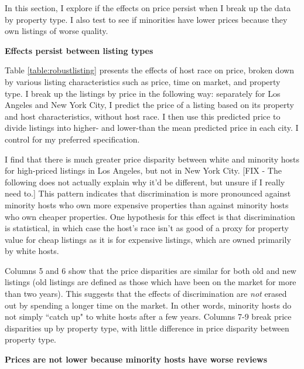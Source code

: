 
In this section, I explore if the effects on price persist when I break up the data by property type. I also test to see if minorities have lower prices because they own listings of worse quality. 

\textbf{Effects persist between listing types}

Table \ref{table:robustlisting} presents the effects of host race on price, broken down by various listing characteristics such as price, time on market, and property type. I break up the listings by price in the following way: separately for Los Angeles and New York City, I predict the price of a listing based on its property and host characteristics, without host race. I then use this predicted price to divide listings into higher- and lower-than the mean predicted price in each city. I control for my preferred specification.  

I find that there is much greater price disparity between white and minority hosts for high-priced listings in Los Angeles, but not in New York City. [FIX - The following does not actually explain why it'd be different, but unsure if I really need to.] This pattern indicates that discrimination is more pronounced against minority hosts who own more expensive properties than against minority hosts who own cheaper properties. One hypothesis for this effect is that discrimination is statistical, in which case the host's race isn't as good of a proxy for property value for cheap listings as it is for expensive listings, which are owned primarily by white hosts. 

Columns 5 and 6 show that the price disparities are similar for both old and new listings (old listings are defined as those which have been on the market for more than two years). This suggests that the effects of discrimination are \textit{not} erased out by spending a longer time on the market. In other words, minority hosts do not simply ``catch up" to white hosts after a few years. Columns 7-9 break price disparities up by property type, with little difference in price disparity between property type. 

\textbf{Prices are not lower because minority hosts have worse reviews} 

